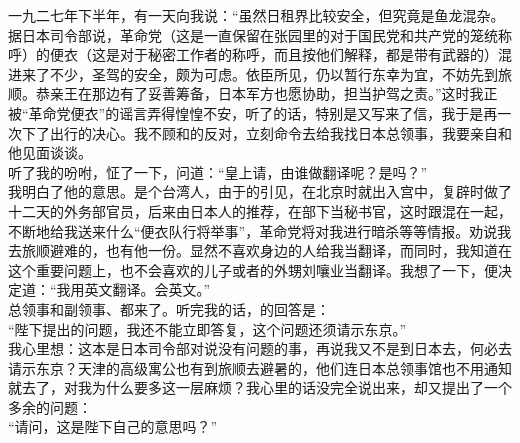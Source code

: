 一九二七年下半年，有一天向我说：“虽然日租界比较安全，但究竟是鱼龙混杂。据日本司令部说，革命党（这是一直保留在张园里的对于国民党和共产党的笼统称呼）的便衣（这是对于秘密工作者的称呼，而且按他们解释，都是带有武器的）混进来了不少，圣驾的安全，颇为可虑。依臣所见，仍以暂行东幸为宜，不妨先到旅顺。恭亲王在那边有了妥善筹备，日本军方也愿协助，担当护驾之责。”这时我正被“革命党便衣”的谣言弄得惶惶不安，听了的话，特别是又写来了信，我于是再一次下了出行的决心。我不顾和的反对，立刻命令去给我找日本总领事，我要亲自和他见面谈谈。\\

听了我的吩咐，怔了一下，问道：“皇上请，由谁做翻译呢？是吗？”\\

我明白了他的意思。是个台湾人，由于的引见，在北京时就出入宫中，复辟时做了十二天的外务部官员，后来由日本人的推荐，在部下当秘书官，这时跟混在一起，不断地给我送来什么“便衣队行将举事”，革命党将对我进行暗杀等等情报。劝说我去旅顺避难的，也有他一份。显然不喜欢身边的人给我当翻译，而同时，我知道在这个重要问题上，也不会喜欢的儿子或者的外甥刘嚷业当翻译。我想了一下，便决定道：“我用英文翻译。会英文。”\\

总领事和副领事、都来了。听完我的话，的回答是：\\

“陛下提出的问题，我还不能立即答复，这个问题还须请示东京。”\\

我心里想：这本是日本司令部对说没有问题的事，再说我又不是到日本去，何必去请示东京？天津的高级寓公也有到旅顺去避暑的，他们连日本总领事馆也不用通知就去了，对我为什么要多这一层麻烦？我心里的话没完全说出来，却又提出了一个多余的问题：\\

“请问，这是陛下自己的意思吗？”\\

